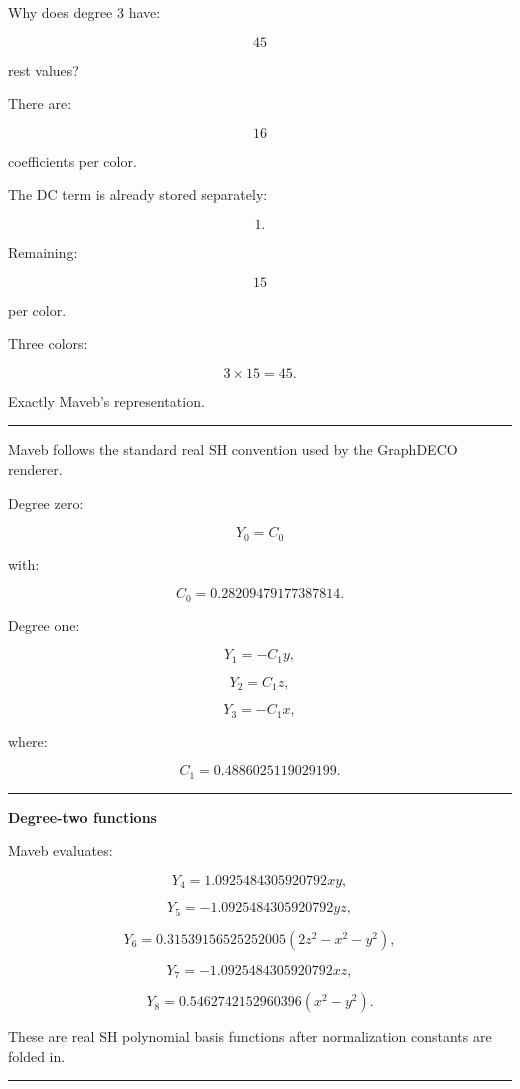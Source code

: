 Why does degree 3 have:

\[
45
\]

rest values?

There are:

\[
16
\]

coefficients per color.

The DC term is already stored separately:

\[
1.
\]

Remaining:

\[
15
\]

per color.

Three colors:

\[
3\times15
=
45.
\]

Exactly Maveb's representation.

\begin{center}\rule{0.5\linewidth}{0.5pt}\end{center}

Maveb follows the standard real SH convention used by the GraphDECO renderer.

Degree zero:

\[
Y_0=
C_0
\]

with:

\[
C_0=
0.28209479177387814.
\]

Degree one:

\[
Y_1=-C_1y,
\]

\[
Y_2=C_1z,
\]

\[
Y_3=-C_1x,
\]

where:

\[
C_1=
0.4886025119029199.
\]

\begin{center}\rule{0.5\linewidth}{0.5pt}\end{center}

\textbf{Degree-two functions}

Maveb evaluates:

\[
Y_4=
1.0925484305920792xy,
\]

\[
Y_5=
-1.0925484305920792yz,
\]

\[
Y_6=
0.31539156525252005
(2z^2-x^2-y^2),
\]

\[
Y_7=
-1.0925484305920792xz,
\]

\[
Y_8=
0.5462742152960396
(x^2-y^2).
\]

These are real SH polynomial basis functions after normalization constants are folded in.

\begin{center}\rule{0.5\linewidth}{0.5pt}\end{center}

